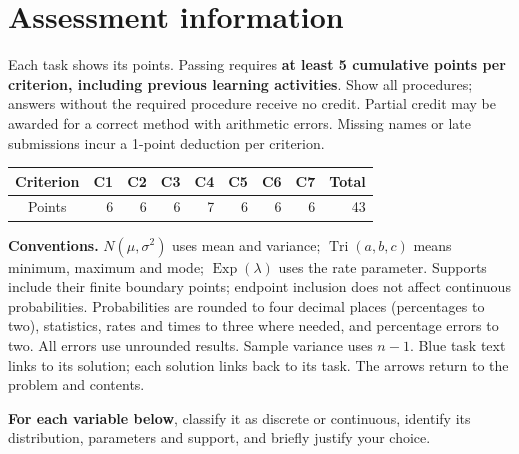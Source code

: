 \section*{Assessment information}
Each task shows its points. Passing requires \textbf{at least 5 cumulative points per criterion, including previous learning activities}.
Show all procedures; answers without the required procedure receive no credit.
Partial credit may be awarded for a correct method with arithmetic errors.
Missing names or late submissions incur a 1-point deduction per criterion.
\begin{center}
\begin{tabular}{c|rrrrrrr|r}
Criterion&C1&C2&C3&C4&C5&C6&C7&Total\\\hline
Points&6&6&6&7&6&6&6&43
\end{tabular}
\end{center}
\textbf{Conventions.} $N(\mu,\sigma^2)$ uses mean and variance;
$\operatorname{Tri}(a,b,c)$ means minimum, maximum and mode;
$\operatorname{Exp}(\lambda)$ uses the rate parameter.
Supports include their finite boundary points; endpoint inclusion does not affect continuous probabilities.
Probabilities are rounded to four decimal places (percentages to two), statistics, rates and times to three where needed, and percentage errors to two.
All errors use unrounded results. Sample variance uses $n-1$.
Blue task text links to its solution; each solution links back to its task. The arrows return to the problem and contents.


\clearpage\def\CurrentProblem{models}
\textbf{For each variable below}, classify it as discrete or continuous, identify its distribution, parameters and support, and briefly justify your choice.

